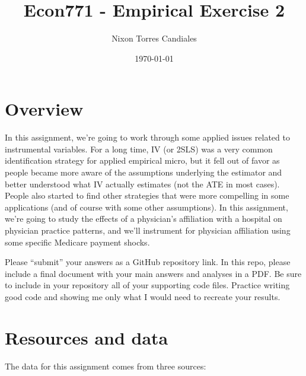 \documentclass[
  12pt,
]{article}
\title{Econ771 - Empirical Exercise 2}
\author{Nixon Torres Candiales}
\date{\today}
\begin{document}
\maketitle


\hypertarget{overview}{%
\section{Overview}\label{overview}}

In this assignment, we're going to work through some applied issues
related to instrumental variables. For a long time, IV (or 2SLS) was a
very common identification strategy for applied empirical micro, but it
fell out of favor as people became more aware of the assumptions
underlying the estimator and better understood what IV actually
estimates (not the ATE in most cases). People also started to find other
strategies that were more compelling in some applications (and of course
with some other assumptions). In this assignment, we're going to study
the effects of a physician's affiliation with a hospital on physician
practice patterns, and we'll instrument for physician affiliation using
some specific Medicare payment shocks.

Please ``submit'' your answers as a GitHub repository link. In this
repo, please include a final document with your main answers and
analyses in a PDF. Be sure to include in your repository all of your
supporting code files. Practice writing good code and showing me only
what I would need to recreate your results.

\hypertarget{resources-and-data}{%
\section{Resources and data}\label{resources-and-data}}

The data for this assignment comes from three sources:
\end{document}
